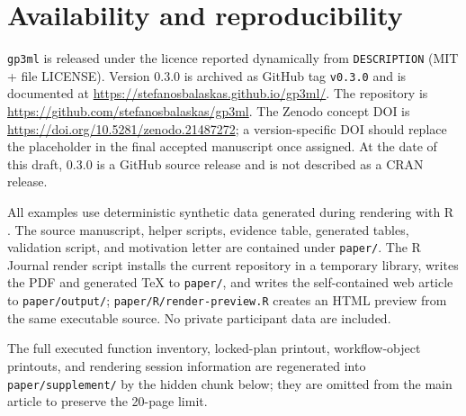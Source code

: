 \section{Availability and reproducibility}\label{availability-and-reproducibility}

\texttt{gp3ml} is released under the licence reported dynamically from \texttt{DESCRIPTION} (MIT + file LICENSE). Version 0.3.0 is archived as GitHub tag \texttt{v0.3.0} and is documented at \url{https://stefanosbalaskas.github.io/gp3ml/}. The repository is \url{https://github.com/stefanosbalaskas/gp3ml}. The Zenodo concept DOI is \url{https://doi.org/10.5281/zenodo.21487272}; a version-specific DOI should replace the placeholder in the final accepted manuscript once assigned. At the date of this draft, 0.3.0 is a GitHub source release and is not described as a CRAN release.

All examples use deterministic synthetic data generated during rendering with R \citep{R2026}. The source manuscript, helper scripts, evidence table, generated tables, validation script, and motivation letter are contained under \texttt{paper/}. The R Journal render script installs the current repository in a temporary library, writes the PDF and generated TeX to \texttt{paper/}, and writes the self-contained web article to \texttt{paper/output/}; \texttt{paper/R/render-preview.R} creates an HTML preview from the same executable source. No private participant data are included.

\appendix

The full executed function inventory, locked-plan printout, workflow-object printouts, and rendering session information are regenerated into \texttt{paper/supplement/} by the hidden chunk below; they are omitted from the main article to preserve the 20-page limit.



\address{%
Stefanos Balaskas\\
eGovernment \& eCommerce Lab (Innovation \& Entrepreneurship), Department of Business Administration\\%
University of Patras, 26504 Patras, Greece\\
%
\url{https://sites.google.com/view/stefbalaskas/}\\%
\textit{ORCID: \href{https://orcid.org/0000-0003-2444-9796}{0000-0003-2444-9796}}\\%
\href{mailto:s.balaskas@ac.upatras.gr}{\nolinkurl{s.balaskas@ac.upatras.gr}}%
}
